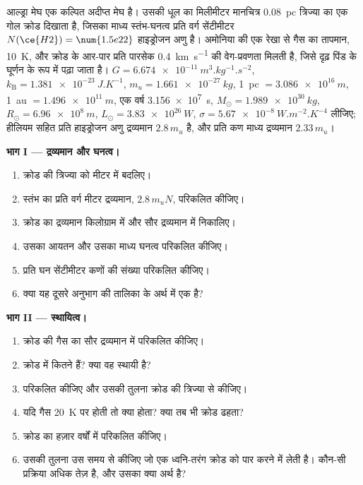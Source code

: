 \begin{problem}
\label{pb:b2:ism-star-formation:1}
आल्ड्रा मेघ एक कल्पित अदीप्त मेघ है। उसकी धूल का मिलीमीटर मानचित्र
\qty{0.08}{pc} त्रिज्या का एक गोल क्रोड दिखाता है, जिसका माध्य स्तंभ-घनत्व
प्रति वर्ग सेंटीमीटर $N(\ce{H2}) = \num{1.5e22}$ हाइड्रोजन अणु है।
अमोनिया की एक रेखा से गैस का तापमान, \qty{10}{K}, और क्रोड के आर-पार प्रति पारसेक
\qty{0.4}{km.s^{-1}} की वेग-प्रवणता मिलती है, जिसे दृढ़ पिंड के
घूर्णन के रूप में पढ़ा जाता है। $G = \qty{6.674e-11}{m^3.kg^{-1}.s^{-2}}$,
$k_{\mathrm B} = \qty{1.381e-23}{J.K^{-1}}$, $m_u = \qty{1.661e-27}{kg}$,
\qty{1}{pc} $= \qty{3.086e16}{m}$, \qty{1}{au} $= \qty{1.496e11}{m}$, एक वर्ष
\qty{3.156e7}{s}, $M_\odot = \qty{1.989e30}{kg}$, $R_\odot = \qty{6.96e8}{m}$,
$L_\odot = \qty{3.83e26}{W}$, $\sigma = \qty{5.67e-8}{W.m^{-2}.K^{-4}}$ लीजिए; हीलियम सहित
प्रति हाइड्रोजन अणु द्रव्यमान $2.8\,m_u$ है, और प्रति कण माध्य द्रव्यमान
$2.33\,m_u$।

\medskip
\noindent\textbf{भाग I --- द्रव्यमान और घनत्व।}
\begin{enumerate}
  \item क्रोड की त्रिज्या को मीटर में बदलिए।
  \item स्तंभ का प्रति वर्ग मीटर द्रव्यमान, $2.8\,m_u N$, परिकलित कीजिए।
  \item क्रोड का द्रव्यमान किलोग्राम में और सौर द्रव्यमान में निकालिए।
  \item उसका आयतन और उसका माध्य घनत्व परिकलित कीजिए।
  \item प्रति घन सेंटीमीटर कणों की संख्या परिकलित कीजिए।
  \item क्या यह दूसरे अनुभाग की तालिका के अर्थ में एक  है?
\end{enumerate}

\noindent\textbf{भाग II --- स्थायित्व।}
\begin{enumerate}[resume]
  \item क्रोड की गैस का  सौर द्रव्यमान में परिकलित कीजिए।
  \item क्रोड में कितने  हैं? क्या वह स्थायी है?
  \item {} परिकलित कीजिए और उसकी तुलना क्रोड की त्रिज्या से कीजिए।
  \item यदि गैस \qty{20}{K} पर होती तो  क्या होता? क्या तब भी
        क्रोड ढहता?
  \item क्रोड का  हज़ार वर्षों में परिकलित कीजिए।
  \item उसकी तुलना उस समय से कीजिए जो एक ध्वनि-तरंग क्रोड को पार करने में लेती है। कौन-सी
        प्रक्रिया अधिक तेज़ है, और उसका क्या अर्थ है?
\end{enumerate}


\end{problem}
